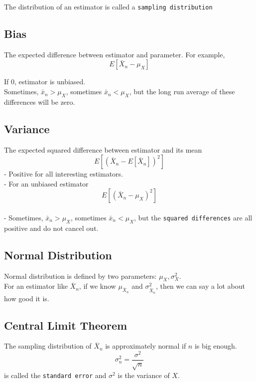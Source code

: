 \documentclass[10pt,landscape,a4paper]{cheatsheet}
\begin{document}
  The distribution of an estimator is called a \texttt{sampling distribution}

  \subsection{Bias}

  The expected difference between estimator and parameter. For example,\\

$$ E[\bar{X}_n - \mu_X] $$

  If 0, estimator is unbiased.\\
  Sometimes, $\bar{x}_n > \mu_X$, sometimes $\bar{x}_n < \mu_X$, but the long run average of these differences will be zero.

  \subsection{Variance}

  The expected squared difference between estimator and its mean\\
  $$ E[(\bar{X}_n - E[\bar{X}_n])^2] $$
  -   Positive for all interesting estimators.\\
  -   For an unbiased estimator\\
  $$ E[(\bar{X}_n - \mu_X)^2] $$\\
  -   Sometimes, $\bar{x}_n > \mu_X$, sometimes $\bar{x}_n < \mu_X$, but the \texttt{squared differences} are all positive and do not cancel out.

  \subsection{Normal Distribution}

  Normal distribution is defined by two parameters: $\mu_X, \sigma^2_X$.\\
  For an estimator like $\bar{X}_n$, if we know $\mu_{\bar{X}_n}$ and $\sigma^2_{\bar{X}_n}$, then we can say a lot about how good it is.

  \subsection{Central Limit Theorem}

  The sampling distribution of $\bar X_n$ is approximately normal if $n$ is big enough.\\
  $$ \sigma_n^2 = \frac{\sigma^2}{\sqrt{n}} $$ 
  is called the \texttt{standard error} and $\sigma^2$ is the variance of $X$.
\end{document}
